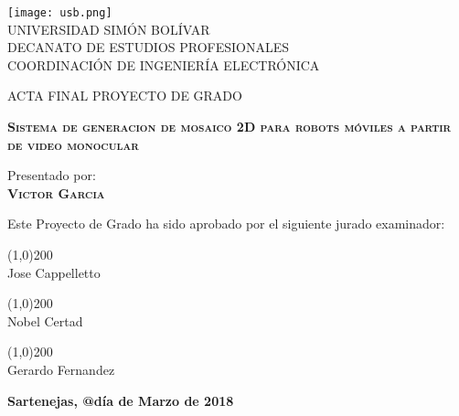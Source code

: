 \begin{titlepage}
\begin{center}

\texttt{[image: usb.png]} \\

\textsc {\large UNIVERSIDAD SIMÓN BOLÍVAR} \\
\textsc{DECANATO DE ESTUDIOS PROFESIONALES\\
COORDINACIÓN DE INGENIERÍA ELECTRÓNICA}

\bigskip
\bigskip
\bigskip
\bigskip

\textsc{ACTA FINAL PROYECTO DE GRADO}

\bigskip
\bigskip

\textsc{\bfseries Sistema de generacion de mosaico 2D para robots móviles a partir de video monocular}

\bigskip
\bigskip
\bigskip

\begin{minipage}{\textwidth}
\centering
Presentado por: \\
\textsc{\bfseries Victor Garcia} \\

\bigskip
\bigskip

Este Proyecto de Grado ha sido aprobado por el siguiente jurado examinador: \\

\bigskip
\bigskip

\line(1,0){200} \\
Jose Cappelletto\\

\bigskip
\bigskip

\line(1,0){200} \\
Nobel Certad\\


\bigskip
\bigskip

\line(1,0){200} \\
Gerardo Fernandez\\

\bigskip
\bigskip

\end{minipage}

\bigskip
\bigskip
\vfill

{\large \bfseries Sartenejas, @día de Marzo de 2018}

\end{center}
\end{titlepage}

